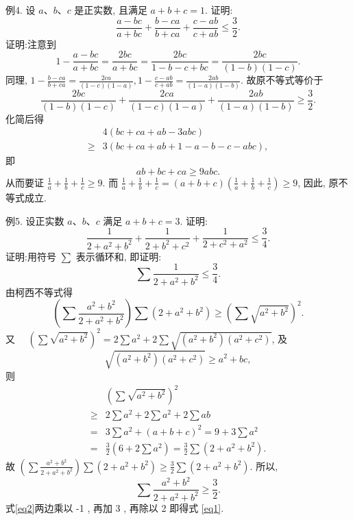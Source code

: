 例4. 设 $a 、 b 、 c$ 是正实数, 且满足 $a+b+c=1$. 证明:
$$
\frac{a-b c}{a+b c}+\frac{b-c a}{b+c a}+\frac{c-a b}{c+a b} \leqslant \frac{3}{2} .
$$
证明:注意到
$$
1-\frac{a-b c}{a+b c}=\frac{2 b c}{a+b c}=\frac{2 b c}{1-b-c+b c}=\frac{2 b c}{(1-b)(1-c)} .
$$
同理, $1-\frac{b-c a}{b+c a}=\frac{2 c a}{(1-c)(1-a)}, 1-\frac{c-a b}{c+a b}=\frac{2 a b}{(1-a)(1-b)}$. 故原不等式等价于
$$
\frac{2 b c}{(1-b)(1-c)}+\frac{2 c a}{(1-c)(1-a)}+\frac{2 a b}{(1-a)(1-b)} \geqslant \frac{3}{2} .
$$
化简后得
$$
\begin{aligned}
& 4(b c+c a+a b-3 a b c) \\
\geqslant & 3(b c+c a+a b+1-a-b-c-a b c),
\end{aligned}
$$
即
$$
a b+b c+c a \geqslant 9 a b c .
$$
从而要证 $\frac{1}{a}+\frac{1}{b}+\frac{1}{c} \geqslant 9$.
而 $\frac{1}{a}+\frac{1}{b}+\frac{1}{c}=(a+b+c)\left(\frac{1}{a}+\frac{1}{b}+\frac{1}{c}\right) \geqslant 9$, 因此, 原不等式成立.



例5. 设正实数 $a 、 b 、 c$ 满足 $a+b+c=3$. 证明:
$$
\frac{1}{2+a^2+b^2}+\frac{1}{2+b^2+c^2}+\frac{1}{2+c^2+a^2} \leqslant \frac{3}{4} .
$$
证明:用符号 $\sum$ 表示循环和, 即证明:
$$
\sum \frac{1}{2+a^2+b^2} \leqslant \frac{3}{4} . \label{eq1}
$$
由柯西不等式得
$$
\left(\sum \frac{a^2+b^2}{2+a^2+b^2}\right) \sum\left(2+a^2+b^2\right) \geqslant\left(\sum \sqrt{a^2+b^2}\right)^2 .
$$
又 $\quad\left(\sum \sqrt{a^2+b^2}\right)^2=2 \sum a^2+2 \sum \sqrt{\left(a^2+b^2\right)\left(a^2+c^2\right)}$,
及
$$
\sqrt{\left(a^2+b^2\right)\left(a^2+c^2\right)} \geqslant a^2+b c,
$$
则
$$
\begin{aligned}
& \left(\sum \sqrt{a^2+b^2}\right)^2 \\
\geqslant & 2 \sum a^2+2 \sum a^2+2 \sum a b \\
= & 3 \sum a^2+(a+b+c)^2=9+3 \sum a^2 \\
= & \frac{3}{2}\left(6+2 \sum a^2\right)=\frac{3}{2} \sum\left(2+a^2+b^2\right) .
\end{aligned}
$$
故 $\left(\sum \frac{a^2+b^2}{2+a^2+b^2}\right) \sum\left(2+a^2+b^2\right) \geqslant \frac{3}{2} \sum\left(2+a^2+b^2\right)$.
所以,
$$
\sum \frac{a^2+b^2}{2+a^2+b^2} \geqslant \frac{3}{2} . \label{eq2}
$$
式\ref{eq2}两边乘以 -1 , 再加 3 , 再除以 2 即得式 \ref{eq1}.



